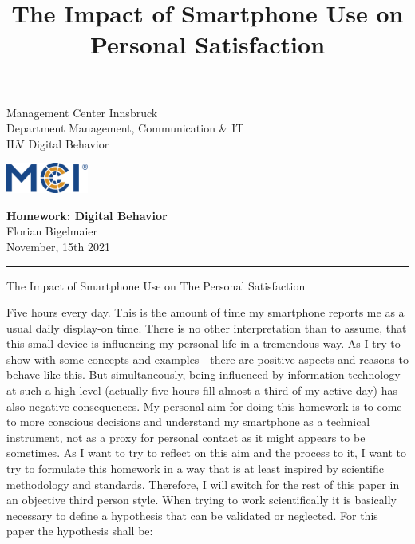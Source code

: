 \documentclass[11pt,a4paper]{article}
\newcommand{\fontsmall}{\fontsize{7pt}{10pt}\selectfont}
\newcommand{\fontnormal}{\fontsize{11pt}{16pt}\selectfont}
\newcommand{\headline}{\fontsize{17pt}{26pt}\selectfont}
\begin{document}
   \title{The Impact of Smartphone Use on Personal Satisfaction} 



\noindent\begin{minipage}{0.5\textwidth}
\fontsmall
Management Center Innsbruck \\
Department Management, Communication \& IT  \\
ILV Digital Behavior


\end{minipage}%
\hfill%
\begin{minipage}{0.3\textwidth}\raggedleft
\includegraphics[height=1.0cm]{mci-logo.png}

\end{minipage}


 
\begin{center}
\textbf{Homework: Digital Behavior}\\   %
Florian Bigelmaier\\                         %
November, 15th 2021\\                         %
\end{center}
\rule{\linewidth}{0.1mm}



\headline \begin{center}
The Impact of Smartphone Use on The Personal Satisfaction
\end{center} 
\fontnormal 
Five hours every day. This is the amount of time my smartphone reports me as a usual daily display-on time. There is no other interpretation than to assume, that this small device is influencing my personal life in a tremendous way. As I try to show with some concepts and examples - there are positive aspects and reasons to behave like this. But simultaneously, being influenced by information technology at such a high level (actually five hours fill almost a third of my active day) has also negative consequences. My personal aim for doing this homework is to come to more conscious decisions and understand my smartphone as a technical instrument, not as a proxy for personal contact as it might appears to be sometimes. As I want to try to reflect on this aim and the process to it, I want to try to formulate this homework in a way that is at least inspired by scientific methodology and standards. Therefore, I will switch for the rest of this paper in an objective third person style. When trying to work scientifically it is basically necessary to define a hypothesis that can be validated or neglected. For this paper the hypothesis shall be:
\end{document}
